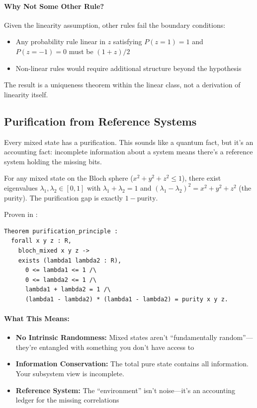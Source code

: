 \paragraph{Why Not Some Other Rule?}
Given the linearity assumption, other rules fail the boundary conditions:
\begin{itemize}
    \item Any probability rule linear in $z$ satisfying $P(z=1) = 1$ and $P(z=-1) = 0$ must be $(1+z)/2$
    \item Non-linear rules would require additional structure beyond the hypothesis
\end{itemize}

The result is a uniqueness theorem within the linear class, not a derivation of linearity itself.

\subsection{Purification from Reference Systems}

Every mixed state has a purification. This sounds like a quantum fact, but it's an accounting fact: incomplete information about a system means there's a reference system holding the missing bits.

\begin{theorem}
For any mixed state on the Bloch sphere ($x^2 + y^2 + z^2 \le 1$), there exist eigenvalues $\lambda_1, \lambda_2 \in [0,1]$ with $\lambda_1 + \lambda_2 = 1$ and $(\lambda_1 - \lambda_2)^2 = x^2 + y^2 + z^2$ (the purity). The purification gap is exactly $1 - \text{purity}$.
\end{theorem}

Proven in :
\begin{lstlisting}
Theorem purification_principle :
  forall x y z : R,
    bloch_mixed x y z ->
    exists (lambda1 lambda2 : R),
      0 <= lambda1 <= 1 /\
      0 <= lambda2 <= 1 /\
      lambda1 + lambda2 = 1 /\
      (lambda1 - lambda2) * (lambda1 - lambda2) = purity x y z.
\end{lstlisting}

\paragraph{What This Means:}
\begin{itemize}
    \item \textbf{No Intrinsic Randomness:} Mixed states aren't ``fundamentally random''---they're entangled with something you don't have access to
    \item \textbf{Information Conservation:} The total pure state contains all information. Your subsystem view is incomplete.
    \item \textbf{Reference System:} The ``environment'' isn't noise---it's an accounting ledger for the missing correlations
\end{itemize}


